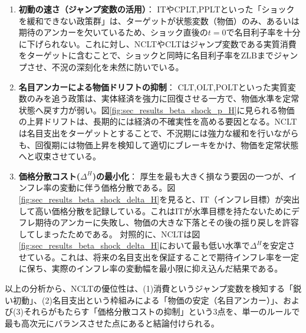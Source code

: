 \begin{enumerate}
    \item\label{itm:sec_results_beta_shock_welfare_factors_jump} \textbf{初動の速さ（ジャンプ変数の活用）}：
    ITやCPLT,PPLTといった「ショックを緩和できない政策群」は、ターゲットが状態変数（物価）のみ、あるいは期待のアンカーを欠いているため、ショック直後の\(t=0\)で名目利子率を十分に下げられない。これに対し、NCLTやCLTはジャンプ変数である実質消費をターゲットに含むことで、ショックと同時に名目利子率をZLBまでジャンプさせ、不況の深刻化を未然に防いでいる。
    \item\label{itm:sec_results_beta_shock_welfare_factors_anchor} \textbf{名目アンカーによる物価ドリフトの抑制}：
    CLT,OLT,POLTといった実質変数のみを追う政策は、実体経済を強力に回復させる一方で、物価水準を定常状態へ戻す力が弱い。図\ref{fig:sec_results_beta_shock_p_H}に見られる物価の上昇ドリフトは、長期的には経済の不確実性を高める要因となる。NCLTは名目支出をターゲットとすることで、不況期には強力な緩和を行いながらも、回復期には物価上昇を検知して適切にブレーキをかけ、物価を定常状態へと収束させている。
    \item\label{itm:sec_results_beta_shock_welfare_factors_delta} \textbf{価格分散コスト(\(\Delta^H\))の最小化}：
    厚生を最も大きく損なう要因の一つが、インフレ率の変動に伴う価格分散である。図\ref{fig:sec_results_beta_shock_delta_H}を見ると、IT（インフレ目標）が突出して高い価格分散を記録している。これはITが水準目標を持たないためにデフレ期待のアンカーに失敗し、物価の大きな下落とその後の揺り戻しを許容してしまったためである。
    対照的に、NCLTは図\ref{fig:sec_results_beta_shock_delta_H}において最も低い水準で\(\Delta^H\)を安定させている。これは、将来の名目支出を保証することで期待インフレ率を一定に保ち、実際のインフレ率の変動幅を最小限に抑え込んだ結果である。
\end{enumerate}

以上の分析から、NCLTの優位性は、(1)消費というジャンプ変数を検知する「鋭い初動」、(2)名目支出という枠組みによる「物価の安定（名目アンカー）」、および(3)それらがもたらす「価格分散コストの抑制」という3点を、単一のルールで最も高次元にバランスさせた点にあると結論付けられる。